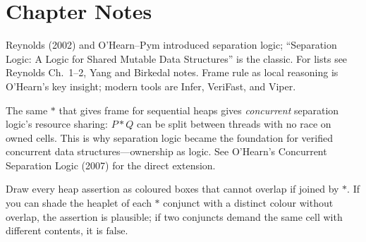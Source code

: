 \section*{Chapter Notes}
Reynolds (2002) and O'Hearn--Pym introduced separation logic; ``Separation Logic: A Logic for Shared Mutable Data Structures'' is the classic. For lists see Reynolds Ch.~1--2, Yang and Birkedal notes. Frame rule as local reasoning is O'Hearn's key insight; modern tools are Infer, VeriFast, and Viper.

\smallskip
\begin{remark}
The same $*$ that gives frame for sequential heaps gives \emph{concurrent} separation logic's resource sharing: $P * Q$ can be split between threads with no race on owned cells. This is why separation logic became the foundation for verified concurrent data structures—ownership as logic. See O'Hearn's Concurrent Separation Logic (2007) for the direct extension.
\end{remark}

\smallskip
\begin{remark}
Draw every heap assertion as coloured boxes that cannot overlap if joined by $*$. If you can shade the heaplet of each $*$ conjunct with a distinct colour without overlap, the assertion is plausible; if two conjuncts demand the same cell with different contents, it is $\text{false}$.
\end{remark}
